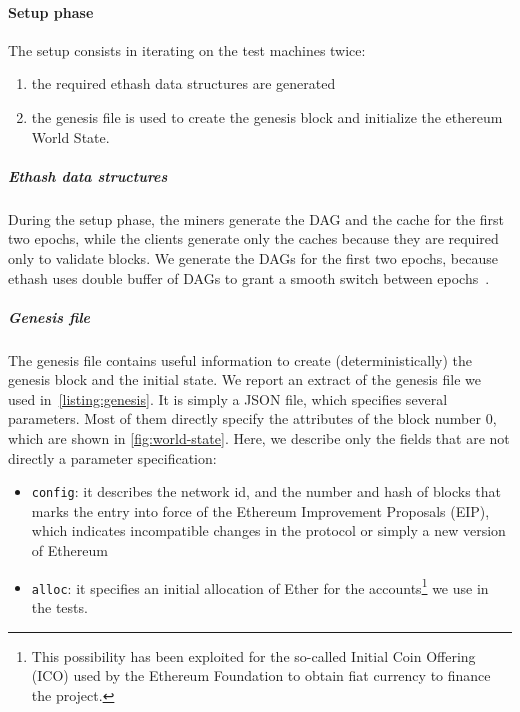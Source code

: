 \paragraph{Setup phase}
The setup consists in iterating on the test machines twice:
\begin{enumerate}
  \item the required ethash data structures are generated
  \item the genesis file is used to create the genesis block and initialize the
  ethereum World State.
\end{enumerate}


\subparagraph{Ethash data structures}
During the setup phase, the miners generate the DAG and the cache for the first
two epochs, while the clients generate only the caches because they are required
only to validate blocks. We generate the DAGs for the first two epochs, because
ethash uses double buffer of DAGs to grant a smooth switch between
epochs~\cite{bib:dagger-hashimoto}.

\subparagraph{Genesis file}
The genesis file contains useful information to create (deterministically) the
genesis block and the initial state. We report an extract of the genesis file we
used in~\autoref{listing:genesis}. It is simply a JSON file, which specifies
several parameters. Most of them directly specify the attributes of the block
number $0$, which are shown in \autoref{fig:world-state}. Here, we describe only
the fields that are not directly a parameter specification:
\begin{itemize}
  \item \texttt{config}: it describes the network id, and the number and hash of
  blocks that marks the entry into force of the Ethereum Improvement Proposals
  (EIP), which indicates incompatible changes in the protocol or simply a new
  version of Ethereum
  \item \texttt{alloc}: it specifies an initial allocation of Ether for the
  accounts\footnote{This possibility has been exploited for the so-called
  Initial Coin Offering (ICO) used by the Ethereum Foundation to obtain fiat
  currency to finance the project.} we use in the tests.
\end{itemize}

\begin{figure}[h!]
  
\end{figure}

